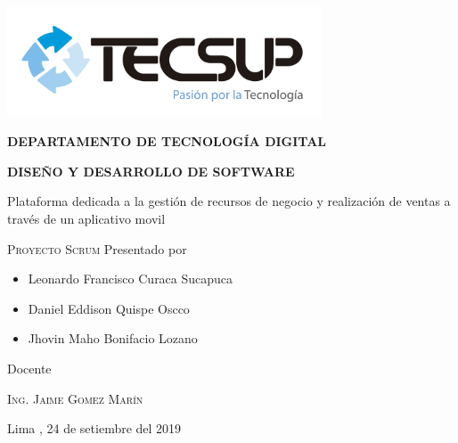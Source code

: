 \begin{titlepage}
	\centering
	\includegraphics[width=0.70\textwidth]{img/logo_tecsup_final}\par\vspace{1cm}
	\vspace{0.30cm}	
	{\scshape\large\bfseries DEPARTAMENTO DE TECNOLOG\'IA DIGITAL \par}
	\vspace{0.60cm}	
	{\scshape\large\bfseries DISEÑO Y DESARROLLO DE SOFTWARE  \par}
	\vspace{2.00cm}		
	{\large\large Plataforma dedicada a la gestión de recursos de negocio y realización de ventas a través de un aplicativo movil \par}
	\vspace{0.60cm}
	{\scshape\large Proyecto Scrum }
	\vspace{0.60cm}
	\vfill
	Presentado por \par
	{\large\itshape { 
		\begin{itemize}
			\item Leonardo Francisco Curaca Sucapuca
			\item Daniel Eddison Quispe Oscco
			\item Jhovin Maho Bonifacio Lozano
		\end{itemize} 
	}\par}
	\vspace{0.30cm}
	\vfill
	Docente \par
  \vspace{0.30cm}
	\vfill
	\textsc{Ing. Jaime Gomez Marín}
	
  \vspace{0.30cm}
	\vfill
        {\large Lima , 24 de setiembre del 2019 \par}
\end{titlepage}


